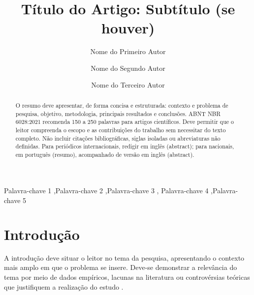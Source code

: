 \documentclass[preprint,12pt,review]{elsarticle}
\begin{document}
\begin{frontmatter}

\title{Título do Artigo: Subtítulo (se houver)}

\author[ufc]{Nome do Primeiro Autor}

\author[ufc]{Nome do Segundo Autor}

\author[outro]{Nome do Terceiro Autor}


\address[ufc]{Universidade Federal do Ceará (UFC), Programa de Pós-Graduação
em Tecnologia Educacional, Fortaleza, CE, Brasil.}

\address[outro]{Instituição do Terceiro Autor, Departamento, Cidade, Estado, Brasil.}

\begin{abstract}
O resumo deve apresentar, de forma concisa e estruturada: contexto e problema
de pesquisa, objetivo, metodologia, principais resultados e conclusões. ABNT
NBR 6028:2021 recomenda 150 a 250 palavras para artigos científicos. Deve
permitir que o leitor compreenda o escopo e as contribuições do trabalho sem
necessitar do texto completo. Não incluir citações bibliográficas, siglas
isoladas ou abreviaturas não definidas. Para periódicos internacionais,
redigir em inglês (abstract); para nacionais, em português (resumo),
acompanhado de versão em inglês (abstract).
\end{abstract}

\begin{keyword}
Palavra-chave 1 \sep Palavra-chave 2 \sep Palavra-chave 3 \sep
Palavra-chave 4 \sep Palavra-chave 5
\end{keyword}

\end{frontmatter}

\section{Introdução}

A introdução deve situar o leitor no tema da pesquisa, apresentando o contexto
mais amplo em que o problema se insere. Deve-se demonstrar a relevância do
tema por meio de dados empíricos, lacunas na literatura ou controvérsias
teóricas que justifiquem a realização do estudo \cite{autor2023}.
\end{document}
